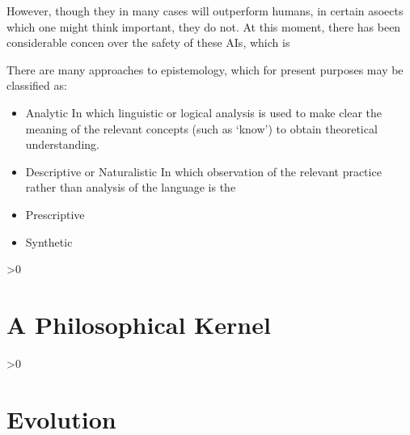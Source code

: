\documentclass[10pt,titlepage]{book}
\newcommand{\ignore}[1]{}
\newcommand{\resetnotes}{%
  \ifnum\value{endnote}>0%
  \theendnotes%
  \setcounter{endnote}{0}%
  \else%
  \fi%
}
\begin{document}
However, though they in many cases will outperform humans, in certain asoects which one might think important, they do not.
At this moment, there has been considerable concen over the safety of these AIs, which is 




There are many approaches to epistemology, which for present purposes may be classified as:
\begin{itemize}
\item Analytic
  In which linguistic or logical analysis is used to make clear the meaning of the relevant concepts (such as `know') to obtain theoretical understanding.
\item Descriptive or Naturalistic
  In which observation of the relevant practice rather than analysis of the language is the 
\item Prescriptive
\item Synthetic
  \end{itemize}
  


\cite{couturat1901logique}


\resetnotes

\chapter{A Philosophical Kernel}\label{PK}

%
\resetnotes

\chapter{Evolution}

\cite{donald1991,murray2017evolution}

\ignore{
\chapter{Synthetic Epistemology and Foundational Abstract Semantics}


\resetnotes

\chapter{The Evolution of Declarative Knowledge}\label{EDK}

%
\resetnotes


\chapter{The Fundamental Triple Trichotomy}\label{FTT}

%
\resetnotes
}%
\end{document}
